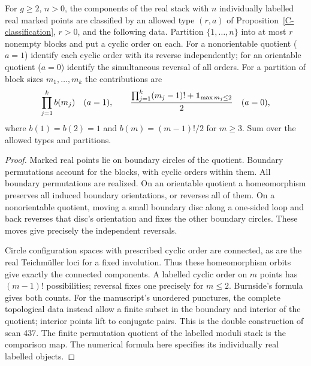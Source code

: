 \begin{proposition}
\label{C-marked-count}
For $g\geq2$, $n>0$, the components of the real
stack with $n$ individually labelled real marked
points are classified by an allowed type $(r,a)$
of Proposition~\ref{C-classification}, $r>0$,
and the following data.
Partition $\{1,\dots,n\}$ into at most $r$
nonempty blocks and put a cyclic order on each.
For a nonorientable quotient ($a=1$) identify
each cyclic order with its reverse independently;
for an orientable quotient ($a=0$) identify
the simultaneous reversal of all orders.
For a partition of block sizes $m_1,\dots,m_k$
the contributions are
\[
 \prod_{j=1}^k b(m_j)\quad(a=1),\qquad
 \frac{\prod_{j=1}^k(m_j-1)!+
              {\bf1}_{\max m_j\leq2}}2\quad(a=0),
\]
where $b(1)=b(2)=1$ and $b(m)=(m-1)!/2$ for $m\geq3$.
Sum over the allowed types and partitions.
\end{proposition}
\begin{proof}
Marked real points lie on boundary circles of
the quotient. Boundary permutations account
for the blocks, with cyclic orders within
them. All boundary permutations are realized.
On an orientable quotient a homeomorphism
preserves all induced boundary orientations,
or reverses all of them. On a nonorientable
quotient, moving a small boundary disc along
a one-sided loop and back reverses that
disc's orientation and fixes the other
boundary circles. These moves give precisely
the independent reversals.

Circle configuration spaces with prescribed
cyclic order are connected, as are the real
Teichmüller loci for a fixed involution.
Thus these homeomorphism orbits give exactly
the connected components.
A labelled cyclic order on $m$ points has
$(m-1)!$ possibilities; reversal fixes one
precisely for $m\leq2$. Burnside's formula
gives both counts.
For the manuscript's unordered punctures,
the complete topological data instead
allow a finite subset in the boundary
and interior of the quotient; interior
points lift to conjugate pairs. This is
the double construction of scan 437.
The finite permutation quotient of the
labelled moduli stack is the comparison
map. The numerical formula here specifies
its individually real labelled objects.
\end{proof}

